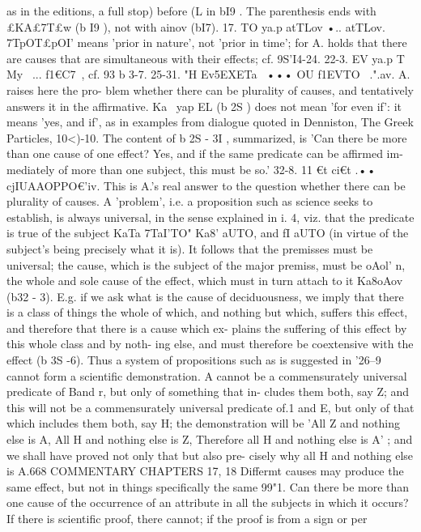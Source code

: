 {{{{{{{{{{{{{{{{{{{{{{{{{{{{{{{{{{{{{{{{{{{{{{{{{{{{{{{{{{{{{{{{{{{{{{as in the editions, a full stop) before (L in bI9 . The parenthesis
ends with £KA£{7T£w (b I9 ), not with ainov (bI7).
17. TO ya.p atTLov •.. atTLov. 7TpOT£pOI' means 'prior in nature',
not 'prior in time'; for A. holds that there are causes that are
simultaneous with their effects; cf. 9S'I4-24.
22-3. EV ya.p T~ My~ ... f1€C7~, cf. 93 b 3-7.
25-31. "H Ev5EXETa~ ••• OU f1EVTO~ .".av. A. raises here the pro-
blem whether there can be plurality of causes, and tentatively
answers it in the affirmative. Ka~ yap EL (b 2S ) does not mean 'for
even if': it means 'yes, and if', as in examples from dialogue
quoted in Denniston, The Greek Particles, 10<)-10. The content of
b 2S - 3I , summarized, is 'Can there be more than one cause of
one effect? Yes, and if the same predicate can be affirmed im-
mediately of more than one subject, this must be so.'
32-8. 11 €t ci€t .•• cjIUAAOPPO€'iv. This is A.'s real answer to the
question whether there can be plurality of causes. A 'problem',
i.e. a proposition such as science seeks to establish, is always
universal, in the sense explained in i. 4, viz. that the predicate
is true of the subject KaTa 7TaI'TO" Ka8' aUTO, and fI aUTO (in virtue
of the subject's being precisely what it is). It follows that the
premisses must be universal; the cause, which is the subject of
the major premiss, must be oAol' n, the whole and sole cause of
the effect, which must in turn attach to it Ka8oAov (b32 - 3). E.g.
if we ask what is the cause of deciduousness, we imply that there
is a class of things the whole of which, and nothing but which,
suffers this effect, and therefore that there is a cause which ex-
plains the suffering of this effect by this whole class and by noth-
ing else, and must therefore be coextensive with the effect (b 3S -6).
Thus a system of propositions such as is suggested in '26--9 cannot
form a scientific demonstration. A cannot be a commensurately
universal predicate of Band r, but only of something that in-
cludes them both, say Z; and this will not be a commensurately
universal predicate of.1 and E, but only of that which includes
them both, say H; the demonstration will be 'All Z and nothing
else is A, All H and nothing else is Z, Therefore all H and nothing
else is A' ; and we shall have proved not only that but also pre-
cisely why all H and nothing else is A.668
COMMENTARY
CHAPTERS 17, 18
Differmt causes may produce the same effect, but not in things
specifically the same
99"1. Can there be more than one cause of the occurrence of
an attribute in all the subjects in which it occurs? If there is
scientific proof, there cannot; if the proof is from a sign or per
}}}}}}}}}}}}}}}}}}}}}}}}}}}}}}}}}}}}}}}}}}}}}}}}}}}}}}}}}}}}}}}}}}}}}}}
